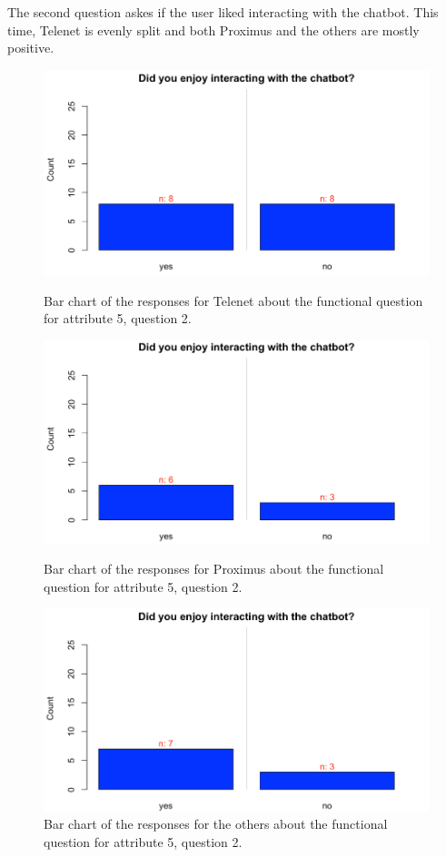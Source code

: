\break
The second question askes if the user liked interacting with the chatbot. This time, Telenet is evenly split and both Proximus and the others are mostly positive.\\
\begin{figure}[!htb]
	\includegraphics[width=\linewidth]{../LaTeX/Figures/Comparative/Q5Tb.png}
	\caption{Bar chart of the responses for Telenet about the functional question for attribute 5, question 2.}\label{fig:Q5Tb}
	\endminipage\hfill
	\includegraphics[width=\linewidth]{../LaTeX/Figures/Comparative/Q5Pb.png}
	\caption{Bar chart of the responses for Proximus about the functional question for attribute 5, question 2.}\label{fig:Q5Pb}
	\endminipage\hfill
	\includegraphics[width=\linewidth]{../LaTeX/Figures/Comparative/Q5Ob.png}
	\caption{Bar chart of the responses for the others about the functional question for attribute 5, question 2.}\label{fig:Q5Ob}
	\endminipage\hfill
\end{figure}
